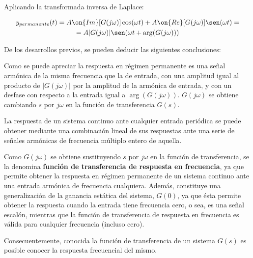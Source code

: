 Aplicando la transformada inversa de Laplace:

\begin{multline}\label{RegPerm}
	y_{permanente}(t) =
		A\on{Im}[G(j\omega)] \cos  (\omega t) + A\on{Re}[G(j\omega)] \sen (\omega t) = \\ 
	= A|G(j\omega)| \sen (\omega t +\arg (G(j\omega)))
\end{multline}


De los desarrollos previos, se pueden deducir las siguientes conclusiones:

\begin{parrafoDestacado}
 
Como se puede apreciar la respuesta en régimen
permanente es una señal armónica de la misma frecuencia que la de entrada, con una amplitud
igual al producto de $|G(j\omega)|$ por la amplitud de la armónica de entrada, y con un desfase
con respecto a la entrada igual a $\arg (G(j\omega))$. $G(j\omega)$ se obtiene cambiando $s$
por $j\omega$ en la función de transferencia $G(s)$.

\end{parrafoDestacado}


\begin{parrafoDestacado}

La respuesta de un sistema continuo ante cualquier entrada
periódica se puede obtener mediante una combinación lineal de sus respuestas ante una serie de
señales armónicas de frecuencia múltiplo entero de aquella.

\end{parrafoDestacado}


Como $G(j\omega)$ se obtiene sustituyendo $s$ por $j\omega$ en la función de transferencia, se
la denomina \textbf{función de transferencia de respuesta en frecuencia}, ya que permite
obtener la respuesta en régimen permanente de un sistema continuo ante una entrada armónica de
frecuencia cualquiera. Además, constituye una generalización de la ganancia estática del
sistema, $G(0)$, ya que ésta permite obtener la respuesta cuando la entrada tiene frecuencia
cero, o sea, es una señal escalón, mientras que la función de transferencia de respuesta en
frecuencia es válida para cualquier frecuencia (incluso cero).

Consecuentemente, conocida la función de transferencia de un sistema $G(s)$ es posible conocer
la respuesta frecuencial del mismo.


